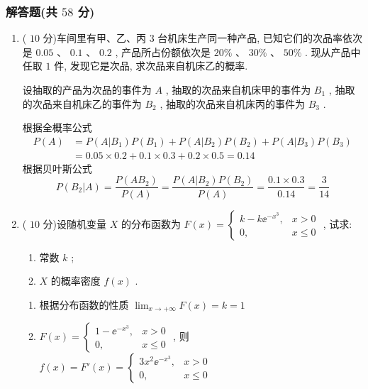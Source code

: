 \subsubsection{解答题(共 $58$ 分)}
\begin{enumerate}
	\item ( $10$ 分)车间里有甲、乙、丙 $3$ 台机床生产同一种产品, 已知它们的次品率依次是 $0.05$ 、 $0.1$ 、 $0.2$ , 产品所占份额依次是 $20\%$ 、 $30\%$ 、 $50\%$ . 现从产品中任取 $1$ 件, 发现它是次品, 求次品来自机床乙的概率.
	\begin{solution}
		设抽取的产品为次品的事件为 $A$ , 抽取的次品来自机床甲的事件为 $B_1$ , 抽取的次品来自机床乙的事件为 $B_2$ , 抽取的次品来自机床丙的事件为 $B_3$ .
		
		根据全概率公式
		\begin{equation*}
			\begin{aligned}
			P(A)&=P(A|B_1)P(B_1)+P(A|B_2)P(B_2)+P(A|B_3)P(B_3)\\
			&=0.05\times0.2+0.1\times0.3+0.2\times0.5=0.14
			\end{aligned}
		\end{equation*}
		根据贝叶斯公式
		\begin{equation*}
			P(B_2|A)=\frac{P(AB_2)}{P(A)}=\frac{P(A|B_2)P(B_2)}{P(A)}=\frac{0.1\times0.3}{0.14}=\frac{3}{14}
		\end{equation*}
	\end{solution}
	
	\item ( $10$ 分)设随机变量 $X$ 的分布函数为 $F(x)=
	\begin{cases}
	k-k\ee^{-x^3}, & x>0\\
	0, & x\leq0
	\end{cases}
	$ , 试求:
	\begin{enumerate}
		\item 常数 $k$ ;
		\item $X$ 的概率密度 $f(x)$ .
	\end{enumerate}
	\begin{solution}
	  \begin{enumerate}
		\item 根据分布函数的性质 $\lim_{x\to+\infty}F(x)=k=1$
		\item $F(x)=
		\begin{cases}
		1-\ee^{-x^3}, & x>0\\
		0, & x\leq0 
		\end{cases}
		$ , 则 $f(x)=F'(x)=
		\begin{cases}
		3x^2\ee^{-x^3}, & x>0\\
		0, & x\leq0
		\end{cases}
		$
	  \end{enumerate}
	\end{solution}


\end{enumerate}
